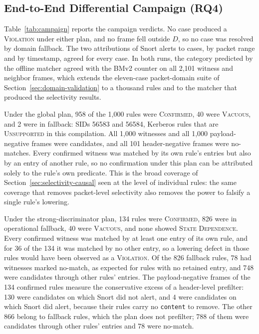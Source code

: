 \documentclass{article}
\begin{document}
\subsection{End-to-End Differential Campaign (RQ4)}
\label{sec:campaign-results}
Table~\ref{tab:campaign} reports the campaign verdicts. No case produced a
\textsc{Violation} under either plan, and no frame fell outside $D$, so no
case was resolved by domain fallback. The two attributions of Snort alerts to
cases, by packet range and by timestamp, agreed for every case. In both
runs, the category predicted by the offline matcher agreed with the BMv2
counter on all 2,101 witness and neighbor frames, which extends the
eleven-case packet-domain suite of Section~\ref{sec:domain-validation} to a
thousand rules and to the matcher that produced the selectivity results.

Under the global plan, 958 of the 1,000 rules were \textsc{Confirmed}, 40
were \textsc{Vacuous}, and 2 were in fallback: SIDs 56583 and 56584, Kerberos
rules that are \textsc{Unsupported} in this compilation. All 1,000 witnesses
and all 1,000 payload-negative frames were candidates, and all 101
header-negative frames were no-matches. Every confirmed witness was matched
by its own rule's entries but also by an entry of another rule, so no
confirmation under this plan can be attributed solely to the rule's own
predicate. This is the broad coverage of
Section~\ref{sec:selectivity-causal} seen at the level of individual rules:
the same coverage that removes packet-level selectivity also removes the
power to falsify a single rule's lowering.

Under the strong-discriminator plan, 134 rules were \textsc{Confirmed}, 826
were in operational fallback, 40 were \textsc{Vacuous}, and none showed
\textsc{State Dependence}. Every confirmed witness was matched by at least
one entry of its own rule, and for 36 of the 134 it was matched by no other
entry, so a lowering defect in those rules would have been observed as a
\textsc{Violation}. Of the 826 fallback rules, 78 had witnesses marked
no-match, as expected for rules with no retained entry, and 748 were
candidates through other rules' entries. The payload-negative frames of the
134 confirmed rules measure the conservative excess of a header-level
prefilter: 130 were candidates on which Snort did not alert, and 4 were
candidates on which Snort did alert, because their rules carry no
\texttt{content} to remove. The other 866 belong to fallback rules, which
the plan does not prefilter; 788 of them were candidates through other
rules' entries and 78 were no-match.
\end{document}
